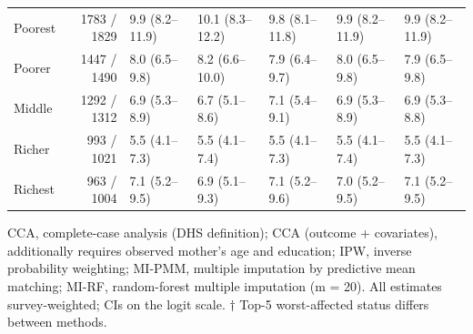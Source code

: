 \documentclass[11pt,a4paper]{article}
\begin{document}
\begin{landscape}
\begin{longtable}{l|rlllll}
\midrule\addlinespace[2.5pt]
\multicolumn{7}{l}{Wasting — Wealth quintile} \\[2.5pt] 
\midrule\addlinespace[2.5pt]
Poorest & 1783 / 1829 & 9.9 (8.2–11.9) & 10.1 (8.3–12.2) & 9.8 (8.1–11.8) & 9.9 (8.2–11.9) & 9.9 (8.2–11.9) \\ 
Poorer & 1447 / 1490 & 8.0 (6.5–9.8) & 8.2 (6.6–10.0) & 7.9 (6.4–9.7) & 8.0 (6.5–9.8) & 7.9 (6.5–9.8) \\ 
Middle & 1292 / 1312 & 6.9 (5.3–8.9) & 6.7 (5.1–8.6) & 7.1 (5.4–9.1) & 6.9 (5.3–8.9) & 6.9 (5.3–8.8) \\ 
Richer & 993 / 1021 & 5.5 (4.1–7.3) & 5.5 (4.1–7.4) & 5.5 (4.1–7.3) & 5.5 (4.1–7.4) & 5.5 (4.1–7.3) \\ 
Richest & 963 / 1004 & 7.1 (5.2–9.5) & 6.9 (5.1–9.3) & 7.1 (5.2–9.6) & 7.0 (5.2–9.5) & 7.1 (5.2–9.5) \\ 
\bottomrule
\end{longtable}
\begin{minipage}{\linewidth}
\vspace{.05em}
CCA, complete-case analysis (DHS definition); CCA (outcome + covariates), additionally requires observed mother's age and education; IPW, inverse probability weighting; MI-PMM, multiple imputation by predictive mean matching; MI-RF, random-forest multiple imputation (m = 20). All estimates survey-weighted; CIs on the logit scale. $\dagger$ Top-5 worst-affected status differs between methods.\\
\end{minipage}
\endgroup

\end{landscape}
\clearpage
\end{document}
